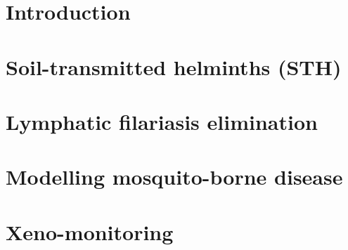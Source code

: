 \documentclass[11pt,a4paper]{report}      %
\begin{document}




\chapter{Introduction}
%



\chapter{Soil-transmitted helminths (STH)}
\label{chap:STH}



\chapter{Lymphatic filariasis elimination}
\label{chap:ELIM}




\chapter{Modelling mosquito-borne disease}
\label{chap:VEC}



\chapter{Xeno-monitoring}
\label{chap:XENO}
\end{document}
